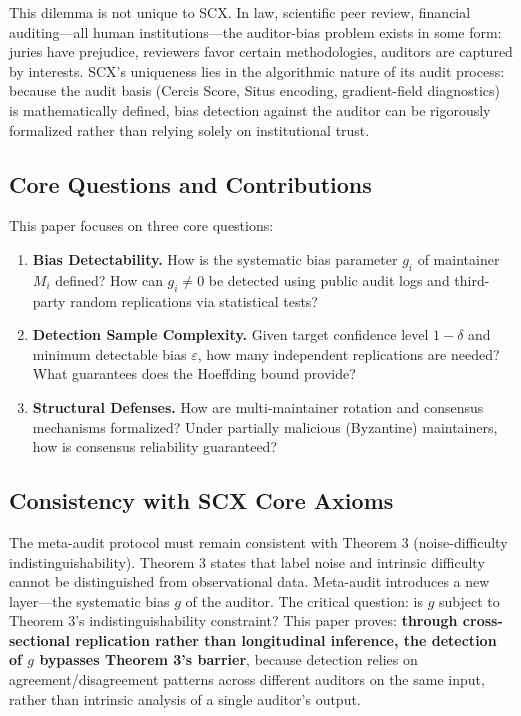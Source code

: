 \documentclass[11pt,a4paper]{article}
\theoremstyle{definition}
\begin{document}
This dilemma is not unique to SCX. In law, scientific peer review, financial auditing---all human institutions---the auditor-bias problem exists in some form: juries have prejudice, reviewers favor certain methodologies, auditors are captured by interests. SCX's uniqueness lies in the algorithmic nature of its audit process: because the audit basis (Cercis Score, Situs encoding, gradient-field diagnostics) is mathematically defined, bias detection against the auditor can be rigorously formalized rather than relying solely on institutional trust.

\subsection{Core Questions and Contributions}

\noindent
This paper focuses on three core questions:

\begin{enumerate}[label=\textbf{Q\arabic*}, leftmargin=*]
    \item \textbf{Bias Detectability.} How is the systematic bias parameter $g_i$ of maintainer $M_i$ defined? How can $g_i \neq 0$ be detected using public audit logs and third-party random replications via statistical tests?
    \item \textbf{Detection Sample Complexity.} Given target confidence level $1-\delta$ and minimum detectable bias $\varepsilon$, how many independent replications are needed? What guarantees does the Hoeffding bound provide?
    \item \textbf{Structural Defenses.} How are multi-maintainer rotation and consensus mechanisms formalized? Under partially malicious (Byzantine) maintainers, how is consensus reliability guaranteed?
\end{enumerate}

\subsection{Consistency with SCX Core Axioms}

\noindent
The meta-audit protocol must remain consistent with Theorem 3 (noise-difficulty indistinguishability). Theorem 3 states that label noise and intrinsic difficulty cannot be distinguished from observational data. Meta-audit introduces a new layer---the systematic bias $g$ of the auditor. The critical question: is $g$ subject to Theorem 3's indistinguishability constraint? This paper proves: \textbf{through cross-sectional replication rather than longitudinal inference, the detection of $g$ bypasses Theorem 3's barrier}, because detection relies on agreement/disagreement patterns across different auditors on the same input, rather than intrinsic analysis of a single auditor's output.
\end{document}
